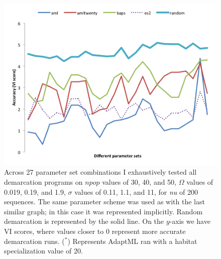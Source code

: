 \begin{figure}[h!]
  \centering
    \includegraphics[scale=0.75]{images/ResultGraphs/ResultGraphs-1}
      \caption[All demarcation graphical accuracy visualization on $nu = 200$.]{Across 27 parameter set combinations I exhaustively tested all demarcation programs on $npop$ values of 30, 40, and 50, $\Omega$ values of 0.019, 0.19, and 1.9, $\sigma$ values of 0.11, 1.1, and 11, for \emph{nu} of 200 sequences. The same parameter scheme was used as with the last similar graph; in this case it was represented implicitly. Random demarcation is represented by the solid line. On the $y$-axis we have VI scores, where values closer to 0 represent more accurate demarcation runs.  ($^\ast$) Represents AdaptML ran with a habitat specialization value of 20.}
    \label{fig:All200}
\end{figure}

